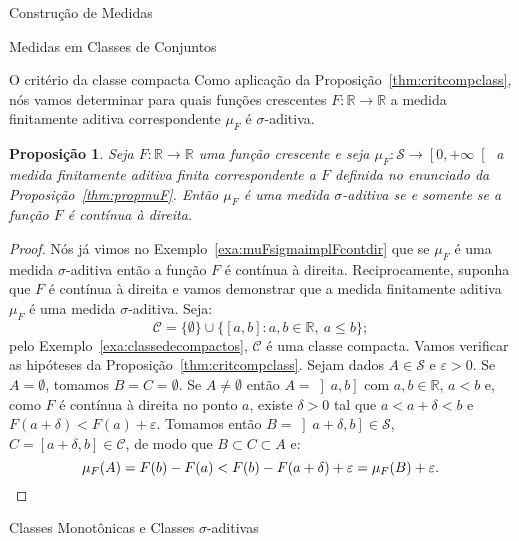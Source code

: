 \documentclass[oneside,final,11pt]{amsbook}
\newcommand{\R}{\mathds R}
\theoremstyle{remark}\newtheorem{exercise}{Exercício}[chapter]
\theoremstyle{remark}\newtheorem{*exercise}[exercise]{\hbox to 0pt{\hskip 0pt minus 1fil*}Exercício}
\theoremstyle{definition}\newtheorem{exdefin}{Definição}[chapter]
\theoremstyle{plain}\newtheorem{teo}{Teorema}[section]
\theoremstyle{plain}\newtheorem{lem}[teo]{Lema}
\theoremstyle{plain}\newtheorem{prop}[teo]{Proposição}
\theoremstyle{plain}\newtheorem{cor}[teo]{Corolário}
\theoremstyle{definition}\newtheorem{defin}[teo]{Definição}
\theoremstyle{remark}\newtheorem{rem}[teo]{Observação}
\theoremstyle{definition}\newtheorem{notation}[teo]{Notação}
\theoremstyle{definition}\newtheorem{convention}[teo]{Convenção}
\theoremstyle{definition}\newtheorem{example}[teo]{Exemplo}
\numberwithin{section}{chapter}
\numberwithin{equation}{section}
\begin{document}
\begin{chapter}{Construção de Medidas}
\begin{section}{Medidas em Classes de Conjuntos}
\begin{subsection}{O critério da classe compacta}
Como aplicação da Proposição~\ref{thm:critcompclass}, nós vamos determinar
para quais funções crescentes $F:\R\to\R$ a medida finitamente aditiva correspondente
$\mu_F$ é $\sigma$-aditiva.
\begin{prop}\label{thm:carmedLebSti}
Seja $F:\R\to\R$ uma função crescente e seja $\mu_F:\mathcal S\to\left[0,+\infty\right[$
a medida finitamente aditiva finita correspondente a $F$ definida no enunciado da Proposição~\ref{thm:propmuF}.
Então $\mu_F$ é uma medida $\sigma$-aditiva se e somente se a função $F$ é contínua à direita.
\end{prop}
\begin{proof}
Nós já vimos no Exemplo~\ref{exa:muFsigmaimplFcontdir} que se $\mu_F$ é uma medida
$\sigma$-aditiva então a função $F$ é contínua à direita.
Reciprocamente, suponha que $F$ é contínua à direita e vamos demonstrar que a medida
finitamente aditiva $\mu_F$ é uma medida $\sigma$-aditiva. Seja:
\[\mathcal C=\{\emptyset\}\cup\big\{[a,b]:a,b\in\R,\ a\le b\big\};\]
pelo Exemplo~\ref{exa:classedecompactos}, $\mathcal C$ é uma classe compacta.
Vamos verificar as hipóteses da Proposição~\ref{thm:critcompclass}. Sejam
dados $A\in\mathcal S$ e $\varepsilon>0$. Se $A=\emptyset$, tomamos
$B=C=\emptyset$. Se $A\ne\emptyset$ então $A=\left]a,b\right]$ com $a,b\in\R$, $a<b$
e, como $F$ é contínua à direita no ponto $a$, existe $\delta>0$ tal que
$a<a+\delta<b$ e $F(a+\delta)<F(a)+\varepsilon$. Tomamos então
$B=\left]a+\delta,b\right]\in\mathcal S$, $C=[a+\delta,b]\in\mathcal C$, de modo
que $B\subset C\subset A$ e:
\[\mu_F(A)=F(b)-F(a)<F(b)-F(a+\delta)+\varepsilon=\mu_F(B)+\varepsilon.\qedhere\]
\end{proof}

\end{subsection}

\end{section}

\begin{section}{Classes Monotônicas e Classes ${\sigma}$-aditivas}


\end{section}
\end{chapter}
\end{document}
